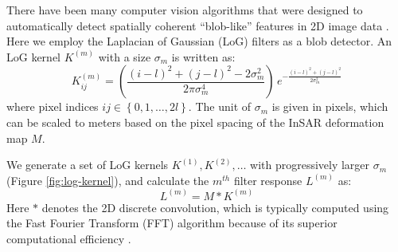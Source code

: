 \documentclass{utexasthesis}
\begin{document}
There have been many computer vision algorithms that were designed to automatically detect spatially coherent ``blob-like'' features in 2D image data \cite{Lindeberg1993DetectingSalientBlob, Lindeberg1998FeatureDetectionAutomatic, Lowe2004DistinctiveImageFeatures}. Here we employ the Laplacian of Gaussian (LoG) filters as a blob detector. An LoG kernel $K^{(m)}$ with a size $\sigma_m$ is written as:
\begin{equation}
K^{(m)}_{ij} = \left(\frac{(i - l)^2 + (j - l)^2 - 2\sigma_m^2}{2 \pi \sigma_m^4}\right) \, e^{-\frac{ (i - l)^2 + (j - l)^2}{2 \sigma_m^2}} \label{eq:log-kernel}
\end{equation}
where pixel indices $ij  \in \left\lbrace 0, 1, \ldots, 2l \right\rbrace$. The unit of $\sigma_m$ is given in pixels, which can be scaled to meters based on the pixel spacing of the InSAR deformation map $M$.


We generate a set of LoG kernels $K^{(1)}, K^{(2)}, \ldots$ with progressively larger $\sigma_m$ (Figure \ref{fig:log-kernel}), and calculate the $m^{th}$ filter response $ L^{(m)} $ as:
\begin{equation}
L^{(m)} = M \ast K^{(m)}  \label{eq:log-layer-conv}
\end{equation}
Here $*$ denotes the 2D discrete convolution, which is typically computed using the Fast Fourier Transform (FFT) algorithm because of its superior computational efficiency \cite{Szeliski2022ComputerVision}.
\end{document}
